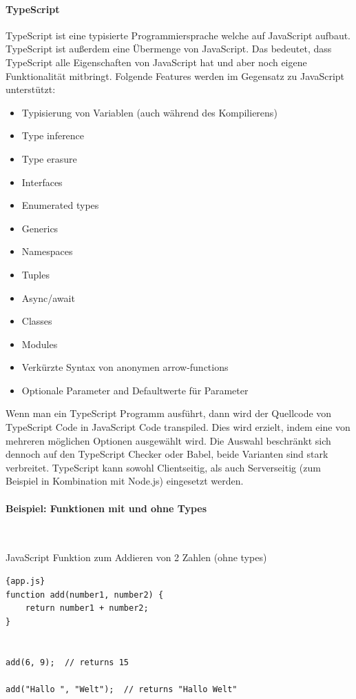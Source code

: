 \paragraph{TypeScript}
TypeScript ist eine typisierte Programmiersprache welche auf JavaScript aufbaut.
TypeScript ist außerdem eine Übermenge von JavaScript.
Das bedeutet, dass TypeScript alle Eigenschaften von JavaScript hat und aber noch eigene Funktionalität mitbringt.
Folgende Features werden im Gegensatz zu JavaScript unterstützt:

\begin{itemize}
    \item Typisierung von Variablen (auch während des Kompilierens)
    \item Type inference
    \item Type erasure
    \item Interfaces
    \item Enumerated types
    \item Generics
    \item Namespaces
    \item Tuples
    \item Async/await
    \item Classes
    \item Modules
    \item Verkürzte Syntax von anonymen arrow-functions
    \item Optionale Parameter and Defaultwerte für Parameter
\end{itemize}

Wenn man ein TypeScript Programm ausführt, dann wird der Quellcode von TypeScript Code in JavaScript Code transpiled.
Dies wird erzielt, indem eine von mehreren möglichen Optionen ausgewählt wird.
Die Auswahl beschränkt sich dennoch auf den TypeScript Checker oder Babel, beide Varianten sind stark verbreitet.
TypeScript kann sowohl Clientseitig, als auch Serverseitig (zum Beispiel in Kombination mit Node.js) eingesetzt werden.

\paragraph{Beispiel: Funktionen mit und ohne Types} \

JavaScript Funktion zum Addieren von 2 Zahlen (ohne types)
\begin{lstlisting}[label={lst:add-function-js}]{app.js}
function add(number1, number2) {
    return number1 + number2;
}


add(6, 9);  // returns 15

add("Hallo ", "Welt");  // returns "Hallo Welt"
\end{lstlisting}

